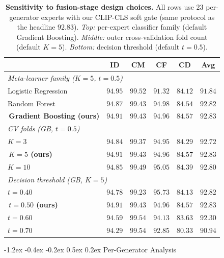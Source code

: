 \documentclass[10pt,twocolumn,letterpaper]{article}
\makeatletter
\renewcommand\subsection{\@startsection{subsection}{2}{\z@}%
  {-1.2ex \@plus -0.4ex \@minus -0.2ex}%
  {0.5ex \@plus 0.2ex}%
  {\normalfont\normalsize\bfseries}}
\makeatother
\begin{document}
\begin{table}[t]
\centering
\footnotesize
\setlength{\tabcolsep}{2.5pt}
\caption{\textbf{Sensitivity to fusion-stage design choices.} All rows use $23$ per-generator experts with our CLIP-CLS soft gate (same protocol as the headline $92.83$). \emph{Top:} per-expert classifier family (default Gradient Boosting). \emph{Middle:} outer cross-validation fold count (default $K{=}5$). \emph{Bottom:} decision threshold (default $t{=}0.5$).}
\label{tab:sensitivity}
\begin{tabular}{l c c c c c}
\toprule
& ID & CM & CF & CD & Avg \\
\midrule
\multicolumn{6}{l}{\emph{Meta-learner family ($K{=}5$, $t{=}0.5$)}} \\
Logistic Regression       & $\mathbf{94.95}$ & $\mathbf{99.52}$ & $91.32$ & $84.12$ & $91.84$ \\
Random Forest             & $94.87$ & $99.43$ & $\mathbf{94.98}$ & $84.54$ & $92.82$ \\
\,\textbf{Gradient Boosting (ours)} & $94.91$ & $99.43$ & $94.96$ & $\mathbf{84.57}$ & $\mathbf{92.83}$ \\
\midrule
\multicolumn{6}{l}{\emph{CV folds (GB, $t{=}0.5$)}} \\
$K{=}3$  & $94.84$ & $99.37$ & $94.95$ & $84.29$ & $92.72$ \\
\,\textbf{$K{=}5$ (ours)}  & $\mathbf{94.91}$ & $99.43$ & $94.96$ & $\mathbf{84.57}$ & $\mathbf{92.83}$ \\
$K{=}10$ & $94.85$ & $\mathbf{99.49}$ & $\mathbf{95.05}$ & $84.39$ & $92.80$ \\
\midrule
\multicolumn{6}{l}{\emph{Decision threshold (GB, $K{=}5$)}} \\
$t{=}0.40$ & $94.78$ & $99.23$ & $\mathbf{95.73}$ & $84.13$ & $92.82$ \\
\,\textbf{$t{=}0.50$ (ours)} & $\mathbf{94.91}$ & $99.43$ & $94.96$ & $\mathbf{84.57}$ & $\mathbf{92.83}$ \\
$t{=}0.60$ & $94.59$ & $\mathbf{99.54}$ & $94.13$ & $83.63$ & $92.30$ \\
$t{=}0.70$ & $94.29$ & $\mathbf{99.54}$ & $92.85$ & $80.33$ & $90.94$ \\
\bottomrule
\end{tabular}
\end{table}

\subsection{Per-Generator Analysis}
\label{sec:per_gen}
\end{document}
